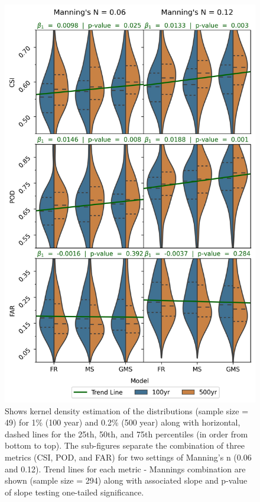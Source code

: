 \documentclass[draft]{dependencies/agujournal2019}
\providecommand{\DIFaddbeginFL}{} %
\providecommand{\DIFaddendFL}{} %
\providecommand{\DIFdelendFL}{} %
\begin{document}
\DIFdelendFL \DIFaddbeginFL \begin{figure}[H]
\DIFaddendFL \centering
\includegraphics[scale=0.9]{figures/violin_plots.jpg}
\caption{Shows kernel density estimation of the distributions (sample size = 49) for 1\% (100 year) and 0.2\% (500 year) along with horizontal, dashed lines for the 25th, 50th, and 75th percentiles (in order from bottom to top).
The sub-figures separate the combination of three metrics (CSI, POD, and FAR) for two settings of Manning's n (0.06 and 0.12).
Trend lines for each metric - Mannings combination are shown (sample size = 294) along with associated slope and p-value of slope testing one-tailed significance.}
\label{fig:violin_plot}
\end{figure}
\end{document}
